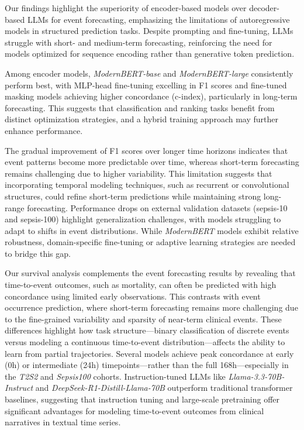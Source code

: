 Our findings highlight the superiority of encoder-based models over decoder-based LLMs for event forecasting, emphasizing the limitations of autoregressive models in structured prediction tasks. Despite prompting and fine-tuning, LLMs struggle with short- and medium-term forecasting, reinforcing the need for models optimized for sequence encoding rather than generative token prediction.

Among encoder models, \textit{ModernBERT-base} and \textit{ModernBERT-large} consistently perform best, with MLP-head fine-tuning excelling in F1 scores and fine-tuned masking models achieving higher concordance (c-index), particularly in long-term forecasting. This suggests that classification and ranking tasks benefit from distinct optimization strategies, and a hybrid training approach may further enhance performance.

The gradual improvement of F1 scores over longer time horizons indicates that event patterns become more predictable over time, whereas short-term forecasting remains challenging due to higher variability. This limitation suggests that incorporating temporal modeling techniques, such as recurrent or convolutional structures, could refine short-term predictions while maintaining strong long-range forecasting. Performance drops on external validation datasets (sepsis-10 and sepsis-100) highlight generalization challenges, with models struggling to adapt to shifts in event distributions. While \textit{ModernBERT} models exhibit relative robustness, domain-specific fine-tuning or adaptive learning strategies are needed to bridge this gap.

Our survival analysis complements the event forecasting results by revealing that time-to-event outcomes, such as mortality, can often be predicted with high concordance using limited early observations. This contrasts with event occurrence prediction, where short-term forecasting remains more challenging due to the fine-grained variability and sparsity of near-term clinical events. These differences highlight how task structure—binary classification of discrete events versus modeling a continuous time-to-event distribution—affects the ability to learn from partial trajectories.
Several models achieve peak concordance at early (0h) or intermediate (24h) timepoints—rather than the full 168h—especially in the \textit{T2S2} and \textit{Sepsis100} cohorts. Instruction-tuned LLMs like \textit{Llama-3.3-70B-Instruct} and \textit{DeepSeek-R1-Distill-Llama-70B} outperform traditional transformer baselines, suggesting that instruction tuning and large-scale pretraining offer significant advantages for modeling time-to-event outcomes from clinical narratives in textual time series.

